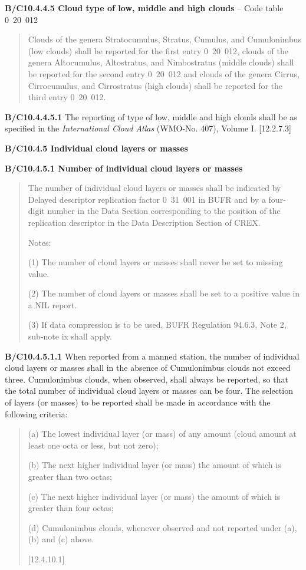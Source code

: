 \textbf{B/C10.4.4.5 Cloud type of low, middle and high clouds} -- Code table 0~20~012

\begin{quote}
Clouds of the genera Stratocumulus, Stratus, Cumulus, and Cumulonimbus (low clouds) shall be reported for the first entry 0~20~012, clouds of the genera Altocumulus, Altostratus, and Nimbostratus (middle clouds) shall be reported for the second entry 0~20~012 and clouds of the genera Cirrus, Cirrocumulus, and Cirrostratus (high clouds) shall be reported for the third entry 0~20~012.
\end{quote}

\textbf{B/C10.4.4.5.1} The reporting of type of low, middle and high clouds shall be as specified in the \emph{International Cloud Atlas} (WMO-No. 407), Volume I. {[}12.2.7.3{]}

\textbf{B/C10.4.5 Individual cloud layers or masses}

\textbf{B/C10.4.5.1 Number of individual cloud layers or masses}

\begin{quote}
The number of individual cloud layers or masses shall be indicated by Delayed descriptor replication factor 0~31~001 in BUFR and by a four-digit number in the Data Section corresponding to the position of the replication descriptor in the Data Description Section of CREX.

Notes:

(1) The number of cloud layers or masses shall never be set to missing value.

(2) The number of cloud layers or masses shall be set to a positive value in a NIL report.

(3) If data compression is to be used, BUFR Regulation 94.6.3, Note 2, sub-note ix shall apply.
\end{quote}

\textbf{B/C10.4.5.1.1} When reported from a manned station, the number of individual cloud layers or masses shall in the absence of Cumulonimbus clouds not exceed three. Cumulonimbus clouds, when observed, shall always be reported, so that the total number of individual cloud layers or masses can be four. The selection of layers (or masses) to be reported shall be made in accordance with the following criteria:

\begin{quote}
(a) The lowest individual layer (or mass) of any amount (cloud amount at least one octa or less, but not zero);

(b) The next higher individual layer (or mass) the amount of which is greater than two octas;

(c) The next higher individual layer (or mass) the amount of which is greater than four octas;

(d) Cumulonimbus clouds, whenever observed and not reported under (a), (b) and (c) above.

{[}12.4.10.1{]}
\end{quote}

